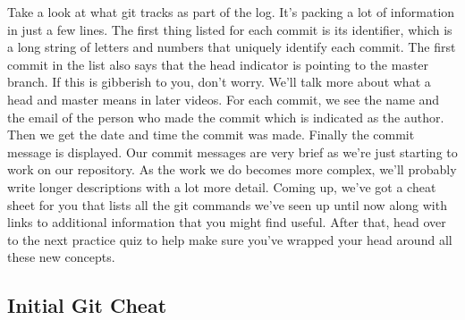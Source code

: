 	Take a look at what git tracks as part of the log. It's packing a lot of information in just a few lines. The first thing listed for each commit is its identifier, which is a long string of letters and numbers that uniquely identify each commit. The first commit in the list also says that the head indicator is pointing to the master branch. If this is gibberish to you, don't worry. We'll talk more about what a head and master means in later videos. For each commit, we see the name and the email of the person who made the commit which is indicated as the author. Then we get the date and time the commit was made. Finally the commit message is displayed. Our commit messages are very brief as we're just starting to work on our repository. As the work we do becomes more complex, we'll probably write longer descriptions with a lot more detail. Coming up, we've got a cheat sheet for you that lists all the git commands we've seen up until now along with links to additional information that you might find useful. After that, head over to the next practice quiz to help make sure you've wrapped your head around all these new concepts.
	
	\subsection{Initial Git Cheat}
	
	

